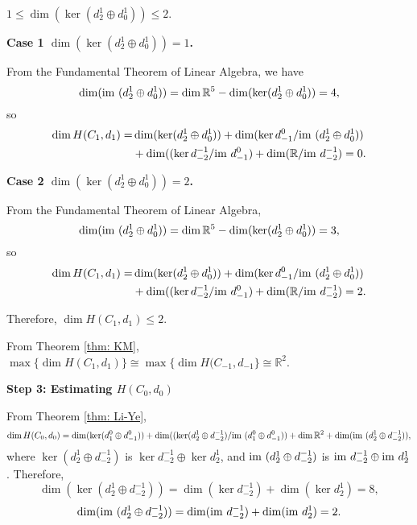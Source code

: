 \documentclass{amsart}
\theoremstyle{definition}
\newcommand{\im}{{\rm im~}}
\begin{document}
 \begin{center}
     $1\leq\dim(\ker (d^1_2 \oplus d^1_0))\leq2$.
 \end{center}

\bigskip

\textbf{Case 1 $\dim(\ker (d^1_2 \oplus d^1_0))=1$.}

From the Fundamental Theorem of Linear Algebra, we have
$$\dim(\im(d^1_2 \oplus d^1_0))= \dim \mathbb{R}^5-\dim(\ker (d^1_2 \oplus d^1_0))= 4,$$
so
\begin{equation*}
    \begin{aligned}
         \dim H(C_1,d_1) = 
         &\dim(\ker (d^1_2 \oplus d^1_0))
         +
         \dim(\ker d^0_{-1}/\im(d^1_2 \oplus d^1_0))\\
         &+
         \dim((\ker d^{-1}_{-2}/\im d^0_{-1})
         +
         \dim(\mathbb{R}/\im d^{-1}_{-2})=0.
    \end{aligned}
\end{equation*}
 
\textbf{Case 2 $\dim(\ker (d^1_2 \oplus d^1_0))=2$.}

From the Fundamental Theorem of Linear Algebra,
$$\dim(\im (d^1_2 \oplus d^1_0))= \dim \mathbb{R}^5-\dim(\ker (d^1_2 \oplus d^1_0))= 3,$$
so
\begin{equation*}
    \begin{aligned}
         \dim H(C_1,d_1) = 
         &\dim(\ker (d^1_2 \oplus d^1_0))
         +
         \dim(\ker d^0_{-1}/\im(d^1_2 \oplus d^1_0))\\
         &+
         \dim((\ker d^{-1}_{-2}/\im d^0_{-1})
         +
         \dim(\mathbb{R}/\im d^{-1}_{-2})=2.
    \end{aligned}
\end{equation*}

\bigskip
Therefore,
$\dim H(C_1,d_1) \leq 2$.

From Theorem \ref{thm: KM}, 
$\max\{\dim H(C_1,d_1)\}\cong\max\{\dim H(C_{-1},d_{-1}\}\cong \mathbb{R}^2$.


\bigskip
\textbf{Step 3: Estimating $H(C_0,d_0)$} 

From Theorem \ref{thm: Li-Ye},
$$\dim H(C_0,d_0)= 
\dim(\ker (d^0_1\oplus d^0_{-1}))
+
\dim((\ker (d^1_2\oplus d^{-1}_{-2})/\im(d^0_1\oplus d^0_{-1}))
+
\dim \mathbb{R}^2
+
\dim (\im (d^1_2\oplus d^{-1}_{-2}))
,$$
where
$\ker (d^1_2\oplus d^{-1}_{-2})$ is $\ker d^{-1}_{-2} \oplus \ker d^{1}_{2}$, and $\im (d^1_2\oplus d^{-1}_{-2})$ is $\im d^{-1}_{-2} \oplus \im d^{1}_{2}$.
Therefore,
$$\dim(\ker (d^1_2\oplus d^{-1}_{-2})) = \dim (\ker d^{-1}_{-2}) + \dim (\ker d^{1}_{2}) = 8,$$
$$\dim(\im (d^1_2\oplus d^{-1}_{-2})) = \dim (\im d^{-1}_{-2}) + \dim (\im d^{1}_{2}) = 2.$$
\end{document}
